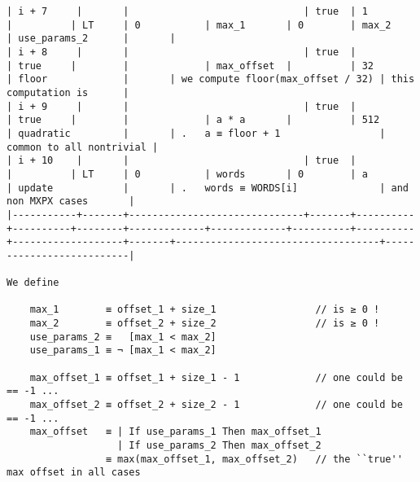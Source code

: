 \documentclass[varwidth=\maxdimen,margin=0.5cm,multi={verbatim}]{standalone}
\begin{document}
\begin{verbatim}
| i + 7     |       |                              | true  | 1        |          | LT     | 0           | max_1       | 0        | max_2    | use_params_2      |       |
| i + 8     |       |                              | true  |          | true     |        |             | max_offset  |          | 32       | floor             |       | we compute floor(max_offset / 32) | this computation is      |
| i + 9     |       |                              | true  |          | true     |        |             | a * a       |          | 512      | quadratic         |       | .   a ≡ floor + 1                 | common to all nontrivial |
| i + 10    |       |                              | true  |          |          | LT     | 0           | words       | 0        | a        | update            |       | .   words ≡ WORDS[i]              | and non MXPX cases       |
|-----------+-------+------------------------------+-------+----------+----------+--------+-------------+-------------+----------+----------+-------------------+-------+-----------------------------------+--------------------------|

We define

    max_1        ≡ offset_1 + size_1                 // is ≥ 0 !
    max_2        ≡ offset_2 + size_2                 // is ≥ 0 !
    use_params_2 ≡   [max_1 < max_2]
    use_params_1 ≡ ¬ [max_1 < max_2]

    max_offset_1 ≡ offset_1 + size_1 - 1             // one could be == -1 ...
    max_offset_2 ≡ offset_2 + size_2 - 1             // one could be == -1 ...
    max_offset   ≡ | If use_params_1 Then max_offset_1
                   | If use_params_2 Then max_offset_2
                 ≡ max(max_offset_1, max_offset_2)   // the ``true'' max offset in all cases

\end{verbatim}
\end{document}
